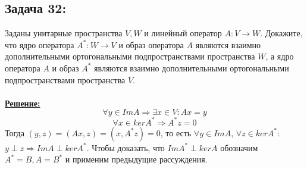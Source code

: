 \documentclass[a4paper,12pt,titlepage,final]{article}
\begin{document}
\subsection*{Задача 32:}
\noindent Заданы унитарные пространства $V, W$ и линейный оператор $A: V \to W$. Докажите, что ядро оператора $A^*: W \to V$ и образ оператора $A$ 
являются взаимно дополнительными ортогональными подпространствами пространства $W$, а ядро оператора $A$ и образ $A^*$ являются 
взаимно дополнительными ортогональными подпространствами пространства $V$.\\ \\
\textbf{\underline{Решение:}} \\
$$\forall y \in ImA \Rightarrow \exists x \in V: Ax = y$$
$$\forall x \in kerA^* \Rightarrow A^*z = 0$$
Тогда $(y, z) = (Ax, z) = (x, A^*z) = 0$, то есть $\forall y \in ImA$, $\forall z \in kerA^*$: $y \perp z \Rightarrow ImA \perp kerA^*$. 
Чтобы доказать, что $ImA^* \perp kerA$ обозначим $A^* = B, A = B^*$ и применим предыдущие рассуждения. \blacksquare \\ \\ \\


\end{document}
